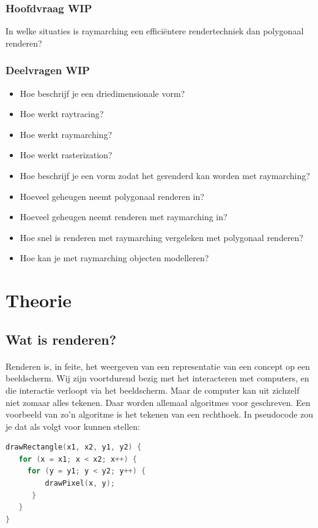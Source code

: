 \documentclass[12pt, a4paper]{article}
\begin{document}
\subsubsection{Hoofdvraag WIP}
In welke situaties is raymarching een efficiëntere rendertechniek dan polygonaal renderen?
\subsubsection{Deelvragen WIP}
\begin{itemize}
\item{Hoe beschrijf je een driedimensionale vorm?}
\item{Hoe werkt raytracing?}
\item{Hoe werkt raymarching?}
\item{Hoe werkt rasterization?}
\item{Hoe beschrijf je een vorm zodat het gerenderd kan worden met raymarching?}
\item{Hoeveel geheugen neemt polygonaal renderen in?}
\item{Hoeveel geheugen neemt renderen met raymarching in?}
\item{Hoe snel is renderen met raymarching vergeleken met polygonaal renderen?}
\item{Hoe kan je met raymarching objecten modelleren?}
\end{itemize}
\clearpage
\section{Theorie}
\subsection{Wat is renderen?}
\paragraph{}
Renderen is, in feite, het weergeven van een representatie van een concept op een beeldscherm. Wij zijn voortdurend bezig met het interacteren met computers, en die interactie verloopt via het beeldscherm. Maar de computer kan uit zichzelf niet zomaar alles tekenen. Daar worden allemaal algoritmes voor geschreven. Een voorbeeld van zo'n algoritme is het tekenen van een rechthoek. In pseudocode zou je dat als volgt voor kunnen stellen:
\begin{lstlisting}[language=C]
drawRectangle(x1, x2, y1, y2) {
   for (x = x1; x < x2; x++) {
     for (y = y1; y < y2; y++) {
         drawPixel(x, y);
      }
   }
}
\end{lstlisting}
\end{document}
